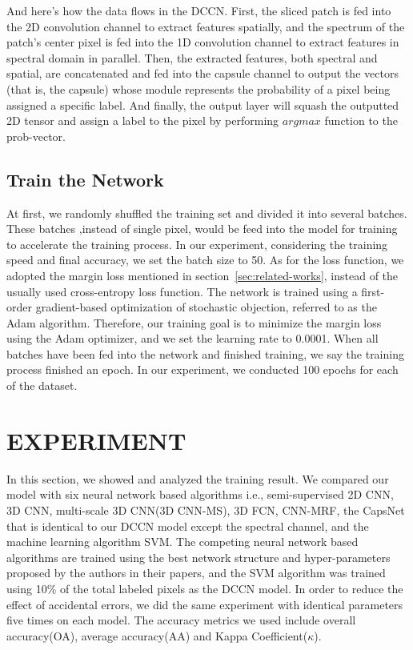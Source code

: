 \documentclass{article}
\begin{document}
	And here's how the data flows in the DCCN.
	First, the sliced patch is fed into the 2D convolution channel to extract features spatially, and the spectrum
	of the patch's center pixel is fed into the 1D convolution channel to extract features in spectral domain in
	parallel.
	Then, the extracted features, both spectral and spatial, are concatenated and fed into the capsule channel to output
	the vectors (that is, the capsule) whose module represents the probability of a pixel being assigned a specific
	label.
	And finally, the output layer will squash the outputted 2D tensor and assign a label to the pixel by performing
	$argmax$ function to the prob-vector.

	\subsection{Train the Network}\label{subsec:train-the-network}
	At first, we randomly shuffled the training set and divided it into several batches.
	These batches ,instead of single pixel, would be feed into the model for training to accelerate the training process.
	In our experiment, considering the training speed and final accuracy, we set the batch size to 50.
	As for the loss function, we adopted the margin loss mentioned in section~\ref{sec:related-works}, instead of the
	usually used cross-entropy loss function.
	The network is trained using a first-order gradient-based optimization of stochastic objection, referred to as the
	Adam algorithm.
	Therefore, our training goal is to minimize the margin loss using the Adam optimizer, and we set the learning rate
	to 0.0001.
	When all batches have been fed into the network and finished training, we say the training process finished an epoch.
	In our experiment, we conducted 100 epochs for each of the dataset.


	\section{EXPERIMENT}\label{sec:experiment}
	In this section, we showed and analyzed the training result.
	We compared our model with six neural network based algorithms i.e.,
	semi-supervised 2D CNN\cite{liu2017semi},
	3D CNN\cite{hamida20183},
	multi-scale 3D CNN(3D CNN-MS)\cite{he2017multi},
	3D FCN\cite{lee2016contextual},
	CNN-MRF\cite{cao2018hyperspectral},
	the CapsNet that is identical to our DCCN model except the spectral channel, and the machine learning algorithm
	SVM\@.
	The competing neural network based algorithms are trained using the best network structure and hyper-parameters
	proposed by the authors in their papers, and the SVM algorithm was trained using 10\% of the total labeled pixels
	as the DCCN model.
	In order to reduce the effect of accidental errors, we did the same experiment with identical parameters five times
	on each model.
	The accuracy metrics we used include overall accuracy(OA), average accuracy(AA) and Kappa Coefficient($\kappa$).
\end{document}
